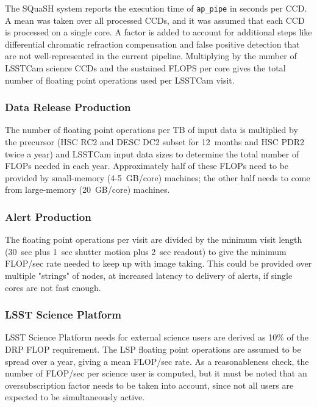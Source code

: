 The SQuaSH system reports the execution time of \texttt{ap\_pipe} in seconds per CCD.
A mean was taken over all processed CCDs, and it was assumed that each CCD is processed on a single core.
A factor is added to account for additional steps like differential chromatic refraction compensation and false positive detection that are not well-represented in the current pipeline.
Multiplying by the number of LSSTCam science CCDs and the sustained FLOPS per core gives the total number of floating point operations used per LSSTCam visit.

\subsubsection{Data Release Production}

The number of floating point operations per TB of input data is multiplied by the precursor (HSC RC2 and DESC DC2 subset for 12~months and HSC PDR2 twice a year) and LSSTCam input data sizes to determine the total number of FLOPs needed in each year.
Approximately half of these FLOPs need to be provided by small-memory (4-5~GB/core) machines; the other half needs to come from large-memory (20~GB/core) machines.

\subsubsection{Alert Production}

The floating point operations per visit are divided by the minimum visit length (30~sec plus 1~sec shutter motion plus 2~sec readout) to give the minimum FLOP/sec rate needed to keep up with image taking.
This could be provided over multiple "strings" of nodes, at increased latency to delivery of alerts, if single cores are not fast enough.

\subsubsection{LSST Science Platform}

LSST Science Platform needs for external science users are derived as 10\% of the DRP FLOP requirement.
The LSP floating point operations are assumed to be spread over a year, giving a mean FLOP/sec rate.
As a reasonableness check, the number of FLOP/sec per science user is computed, but it must be noted that an oversubscription factor needs to be taken into account, since not all users are expected to be simultaneously active.
